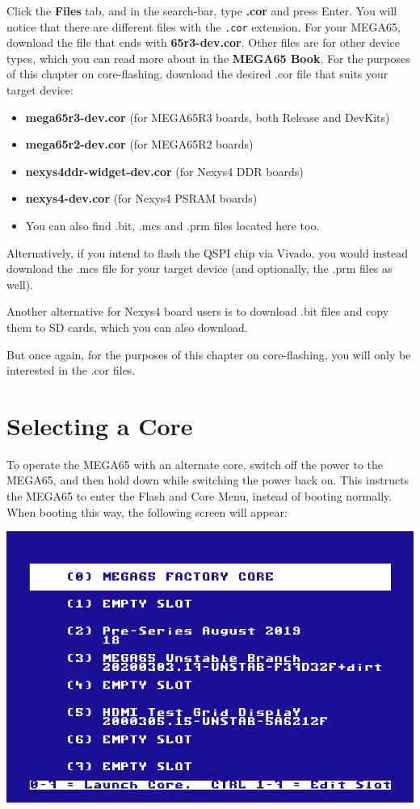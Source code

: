 Click the {\bf Files} tab, and in the search-bar, type {\bf .cor} and press Enter.
\ifdefined\printmanual
  You will notice that there are different files with the {\tt .cor} extension. For your MEGA65, download the file
  that ends with {\bf 65r3-dev.cor}. Other files are for other device types, which you can read more about in the
  {\bf MEGA65 Book}.
\else
  For the purposes of this chapter on core-flashing, download the desired .cor file that suits your target device:

  \begin{itemize}
    \item{\textbf{mega65r3-dev.cor} (for MEGA65R3 boards, both Release and DevKits)}
    \item{\textbf{mega65r2-dev.cor} (for MEGA65R2 boards)}
    \item{\textbf{nexys4ddr-widget-dev.cor} (for Nexys4 DDR boards)}
    \item{\textbf{nexys4-dev.cor} (for Nexys4 PSRAM boards)}
    \item{You can also find .bit, .mcs and .prm files located here too.}
  \end{itemize}

  Alternatively, if you intend to flash the QSPI chip via Vivado, you would instead download the .mcs file for your target device (and optionally, the .prm files as well).

  Another alternative for Nexys4 board users is to download .bit files and copy them to SD cards, which you can also download.

  But once again, for the purposes of this chapter on core-flashing, you will only be interested in the .cor files.
\fi

\section{Selecting a Core}

To operate the MEGA65 with an alternate core, switch off the power to the MEGA65, and then hold
 down while switching the power back on. This instructs the MEGA65 to enter the
Flash and Core Menu, instead of booting normally. When booting this way, the following screen will appear:

\begin{center}
\includegraphics[trim= 0  0 0 10mm,clip,width=0.7\linewidth]{images/ss-flashmenu.png}
\end{center}

